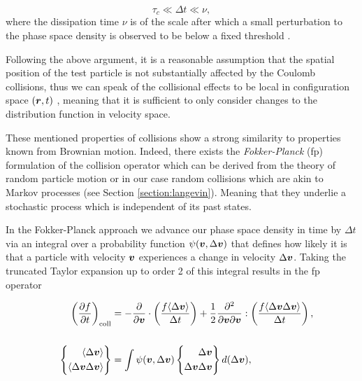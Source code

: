 \begin{equation}
    \label{eq:timescales}
    \tau_c \ll \Delta t \ll \nu,
\end{equation}
where the dissipation time $\nu$ is of the scale after which a small perturbation to the phase space
density is observed to be below a fixed threshold \cite{fannjiang2003noise}.

Following the above argument, it is a reasonable assumption that the spatial position of the test particle is not 
substantially affected by the Coulomb collisions, thus we can speak of the collisional effects to be local in 
configuration space $(\boldsymbol{r}, t)$ \cite{Callend2018Chapter3},
meaning that it is sufficient to only consider changes to the distribution function in velocity space.

These mentioned properties of collisions show a strong similarity to properties known from Brownian motion.
Indeed, there exists the \emph{Fokker-Planck} (\gls{fp}) formulation of the collision operator which can be
derived from the theory of random particle motion or in our case random collisions which are akin to Markov processes (see
Section \ref{section:langevin}). Meaning that they underlie a stochastic process which is independent
of its past states.

In the Fokker-Planck approach we advance our phase space density in time by $\Delta t$ via an
integral over a probability function $\psi(\boldsymbol{v}, \Delta \boldsymbol{v})$ that defines how likely
it is that a particle with velocity $\boldsymbol{v}$ experiences a change in velocity $\Delta \boldsymbol{v}$.
Taking the truncated Taylor expansion up to order 2 of this integral results in the \gls{fp} operator

\begin{align}
    \label{eq:fokkerPlanckTerm}
    \left( \frac{\partial f}{\partial t} \right)_{\text{coll}} &= - \frac{\partial}{\partial \boldsymbol{v}} \nonumber
    \cdot \left( \frac{f \langle \Delta \boldsymbol{v} \rangle }{\Delta t} \right) + \frac{1}{2}
    \frac{\partial^2}{\partial \boldsymbol{v} \partial \boldsymbol{v}} : \left( \frac{f \langle \Delta \boldsymbol{v}
    \Delta \boldsymbol{v} \rangle}{\Delta t} \right),
    \\ \\
    \quad \left\{ 
    \begin{aligned}
        \langle \Delta \boldsymbol{v} \rangle \\
        \langle \Delta \boldsymbol{v} \Delta \boldsymbol{v} \rangle
    \end{aligned}
    \right\} 
                                                               &= \int \psi(\boldsymbol{v}, \Delta \boldsymbol{v}) \nonumber
    \left\{ 
    \begin{aligned}
        \Delta \boldsymbol{v} \\
        \Delta \boldsymbol{v} \Delta \boldsymbol{v}
    \end{aligned}
     \right\} d(\Delta \boldsymbol{v}),
\end{align}

